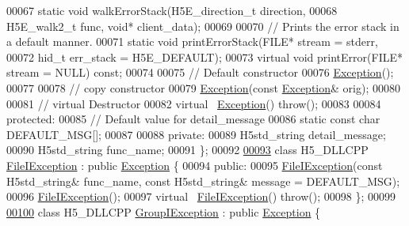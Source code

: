 \begin{DoxyCode}
00067         \textcolor{keyword}{static} \textcolor{keywordtype}{void} walkErrorStack(H5E\_direction\_t direction,
00068                                    H5E\_walk2\_t func, \textcolor{keywordtype}{void}* client\_data);
00069 
00070         \textcolor{comment}{// Prints the error stack in a default manner.}
00071         \textcolor{keyword}{static} \textcolor{keywordtype}{void} printErrorStack(FILE* stream = stderr,
00072                                     hid\_t err\_stack = H5E\_DEFAULT);
00073         \textcolor{keyword}{virtual} \textcolor{keywordtype}{void} printError(FILE* stream = NULL) \textcolor{keyword}{const};
00074 
00075         \textcolor{comment}{// Default constructor}
00076         \hyperlink{class_h5_1_1_exception}{Exception}();
00077 
00078         \textcolor{comment}{// copy constructor}
00079         \hyperlink{class_h5_1_1_exception}{Exception}(\textcolor{keyword}{const} \hyperlink{class_h5_1_1_exception}{Exception}& orig);
00080 
00081         \textcolor{comment}{// virtual Destructor}
00082         \textcolor{keyword}{virtual} ~\hyperlink{class_h5_1_1_exception}{Exception}() \textcolor{keywordflow}{throw}();
00083 
00084    \textcolor{keyword}{protected}:
00085         \textcolor{comment}{// Default value for detail\_message}
00086         \textcolor{keyword}{static} \textcolor{keyword}{const} \textcolor{keywordtype}{char} DEFAULT\_MSG[];
00087 
00088    \textcolor{keyword}{private}:
00089         H5std\_string detail\_message;
00090         H5std\_string func\_name;
00091 \};
00092 
\hyperlink{class_h5_1_1_file_i_exception}{00093} \textcolor{keyword}{class }H5\_DLLCPP \hyperlink{class_h5_1_1_file_i_exception}{FileIException} : \textcolor{keyword}{public} \hyperlink{class_h5_1_1_exception}{Exception} \{
00094    \textcolor{keyword}{public}:
00095         \hyperlink{class_h5_1_1_file_i_exception}{FileIException}(\textcolor{keyword}{const} H5std\_string& func\_name, \textcolor{keyword}{const} H5std\_string& message = 
      DEFAULT\_MSG);
00096         \hyperlink{class_h5_1_1_file_i_exception}{FileIException}();
00097         \textcolor{keyword}{virtual} ~\hyperlink{class_h5_1_1_file_i_exception}{FileIException}() \textcolor{keywordflow}{throw}();
00098 \};
00099 
\hyperlink{class_h5_1_1_group_i_exception}{00100} \textcolor{keyword}{class }H5\_DLLCPP \hyperlink{class_h5_1_1_group_i_exception}{GroupIException} : \textcolor{keyword}{public} \hyperlink{class_h5_1_1_exception}{Exception} \{

\end{DoxyCode}
